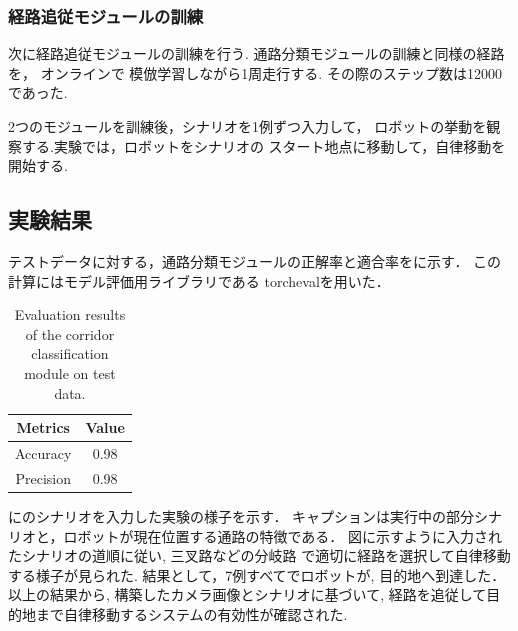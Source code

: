 \subsubsection{経路追従モジュールの訓練}
次に経路追従モジュールの訓練を行う.
通路分類モジュールの訓練と同様の経路を，
オンラインで 模倣学習しながら1周走行する.
その際のステップ数は12000であった.

2つのモジュールを訓練後，シナリオを1例ずつ入力して，
ロボットの挙動を観察する.実験では，ロボットをシナリオの
スタート地点に移動して，自律移動を開始する.

\vspace{5zh}



\newpage
\subsection{実験結果}
テストデータに対する，通路分類モジュールの正解率と適合率をに示す．
この計算にはモデル評価用ライブラリである
torcheval\cite{torcheval}を用いた．
\begin{table}[htbp]
    \centering
    \caption{Evaluation results of the corridor classification module on test data.}
    \label{tab:result}
    \begin{tabular}{c|c}
    \hline
    Metrics & Value       \\
    \hline
    Accuracy   & 0.98 \\
    Precision   & 0.98 \\
    \hline
    \end{tabular}
\end{table}

にのシナリオを入力した実験の様子を示す．
キャプションは実行中の部分シナリオと，ロボットが現在位置する通路の特徴である．
図に示すように入力されたシナリオの道順に従い, 三叉路などの分岐路
で適切に経路を選択して自律移動する様子が見られた.
結果として，7例すべてでロボットが, 目的地へ到達した．
以上の結果から, 構築したカメラ画像とシナリオに基づいて, 
経路を追従して目的地まで自律移動するシステムの有効性が確認された.

